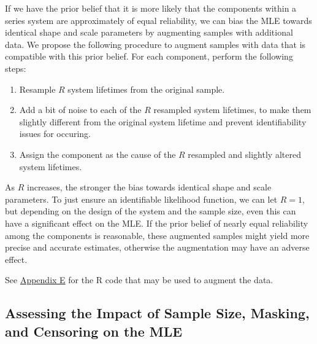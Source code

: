 \documentclass[
]{article}
\providecommand{\tightlist}{%
  \setlength{\itemsep}{0pt}\setlength{\parskip}{0pt}}
\begin{document}
If we have the prior belief that it is more likely that the components
within a series system are approximately of equal reliability, we can
bias the MLE towards identical shape and scale parameters by augmenting
samples with additional data. We propose the following procedure to
augment samples with data that is compatible with this prior belief. For
each component, perform the following steps:

\begin{enumerate}
\def\labelenumi{\arabic{enumi}.}
\tightlist
\item
  Resample \(R\) system lifetimes from the original sample.
\item
  Add a bit of noise to each of the \(R\) resampled system lifetimes, to
  make them slightly different from the original system lifetime and
  prevent identifiability issues for occuring.
\item
  Assign the component as the cause of the \(R\) resampled and slightly
  altered system lifetimes.
\end{enumerate}

As \(R\) increases, the stronger the bias towards identical shape and
scale parameters. To just ensure an identifiable likelihood function, we
can let \(R = 1\), but depending on the design of the system and the
sample size, even this can have a significant effect on the MLE. If the
prior belief of nearly equal reliability among the components is
reasonable, these augmented samples might yield more precise and
accurate estimates, otherwise the augmentation may have an adverse
effect.

See \hyperref[app:augment-code]{Appendix E} for the R code that may be
used to augment the data.

\hypertarget{assessing-the-impact-of-sample-size-masking-and-censoring-on-the-mle}{%
\subsection{Assessing the Impact of Sample Size, Masking, and Censoring
on the
MLE}\label{assessing-the-impact-of-sample-size-masking-and-censoring-on-the-mle}}
\end{document}
